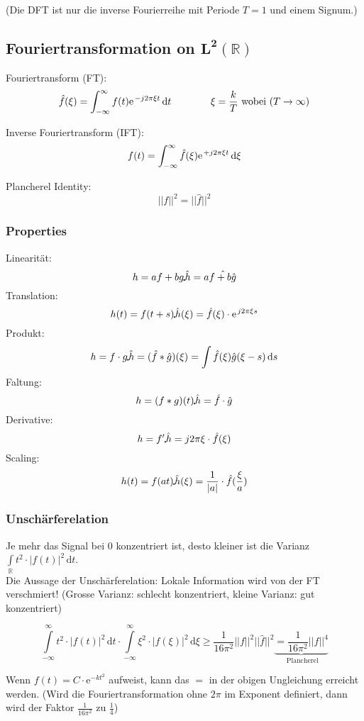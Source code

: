 (Die DFT ist nur die inverse Fourierreihe mit Periode $T=1$ und einem Signum.)

\newpage
\subsection{Fouriertransformation on $\mathbf{L^2(\mathbb{R})}$}

Fouriertransform (FT): \[ \hat{f}(\xi) = \int_{-\infty}^{\infty}f(t) \e^{-j 2\pi \xi t} \, \mathrm{d}t \qquad \qquad \xi = \frac{k}{T} \text{ wobei } (T \rightarrow \infty) \]

Inverse Fouriertransform (IFT): \[ f(t) = \int_{-\infty}^{\infty}\hat{f}(\xi) \e^{+j 2\pi \xi t} \, \mathrm{d}\xi \]

Plancherel Identity: \[ ||f||^2 = ||\hat{f}||^2 \]

\subsubsection{Properties}
Linearität: \[ h = af + bg \FT \hat{h} = a\hat{f + b\hat{g}} \]
Translation: \[ h(t) = f(t+s) \FT \hat{h}(\xi) = \hat{f}(\xi) \cdot \e^{j2\pi\xi s} \]
Produkt: \[ h = f \cdot g \FT \hat{h} = (\hat{f}\ast\hat{g})(\xi) = \int \hat{f}(\xi) \hat{g}(\xi - s) \,\mathrm{d}s \]
Faltung: \[ h = (f\ast g)(t) \FT \hat{h} = \hat{f} \cdot \hat{g} \]
Derivative: \[ h = f' \FT \hat{h} = j2\pi\xi\cdot\hat{f}(\xi) \]
Scaling: \[ h(t) = f(at) \FT \hat{h}(\xi) = \frac{1}{|a|} \cdot \hat{f}(\frac{\xi}{a}) \]

\subsubsection{Unschärferelation}
Je mehr das Signal bei 0 konzentriert ist, desto kleiner ist die Varianz $\int\limits_{\mathbb{R}} t^2 \cdot |f(t)|^2 \,\mathrm{d}t$.\\
Die Aussage der Unschärferelation: Lokale Information wird von der FT verschmiert!
(Grosse Varianz: schlecht konzentriert, kleine Varianz: gut konzentriert)

\[  
	\int\limits_{-\infty}^\infty t^2 \cdot |f(t)|^2 \, \mathrm{d}t \cdot \int\limits_{-\infty}^\infty \xi^2 \cdot |f(\xi)|^2 \, \mathrm{d}\xi
	\geq \frac{1}{16 \pi^2} ||f||^2||\hat{f}||^2 \underbrace{= \frac{1}{16 \pi^2} ||f||^4}_{\text{ Plancherel}}
\]

Wenn $f(t)=C \cdot \mathrm{e}^{-kt^2}$ aufweist, kann das $=$ in der obigen Ungleichung erreicht werden. (Wird die Fouriertransformation ohne $2\pi$ im Exponent definiert, dann wird der Faktor $\frac{1}{16\pi^2}$ zu $\frac{1}{4}$)

